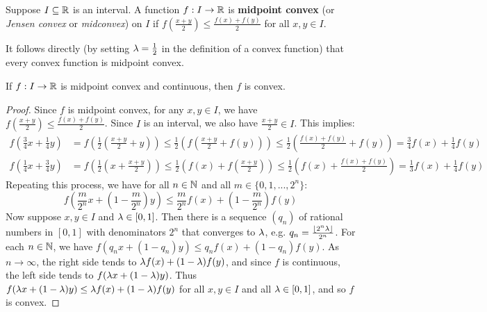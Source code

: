 \documentclass{article}
\begin{document}
\begin{definition}
    Suppose $I\sub\R$ is an interval. A function $f:I\to\R$ is \textbf{midpoint convex} (or \textit{Jensen convex} or \textit{midconvex}) on $I$ if $f\left(\frac{x+y}{2}\right)\le\frac{f(x)+f(y)}{2}$ for all $x,y\in I$.
\end{definition}
\begin{remark}
    It follows directly (by setting $\lambda=\frac{1}{2}$ in the definition of a convex function) that every convex function is midpoint convex.
\end{remark}



\begin{theorem}
    If $f:I\to\R$ is midpoint convex and continuous, then $f$ is convex.
\end{theorem}
\begin{proof}
    Since $f$ is midpoint convex, for any $x,y\in I$, we have $f\left(\frac{x+y}{2}\right)\le\frac{f(x)+f(y)}{2}$. Since $I$ is an interval, we also have $\frac{x+y}{2}\in I$. This implies:
    \begin{align*}
        f\left(\frac{3}{4}x+\frac{1}{4}y\right)
        &=f\left(\frac{1}{2}\left(\frac{x+y}{2}+y\right)\right)
        \le\frac{1}{2}\left(f\left(\frac{x+y}{2}+f(y)\right)\right)
        \le\frac{1}{2}\left(\frac{f(x)+f(y)}{2}+f(y)\right)
        =\frac{3}{4}f(x)+\frac{1}{4}f(y)
        \\
        f\left(\frac{1}{4}x+\frac{3}{4}y\right)
        &=f\left(\frac{1}{2}\left(x+\frac{x+y}{2}\right)\right)
        \le\frac{1}{2}\left(f(x)+f\left(\frac{x+y}{2}\right)\right)
        \le\frac{1}{2}\left(f(x)+\frac{f(x)+f(y)}{2}\right)
        =\frac{1}{3}f(x)+\frac{1}{4}f(y)
    \end{align*}
    Repeating this process, we have for all $n\in\N$ and all $m\in\{0,1,...,2^n\}$:
    \begin{equation*}
        f\left(\frac{m}{2^n}x+\left(1-\frac{m}{2^n}\right)y\right)
        \le\frac{m}{2^n}f(x)+\left(1-\frac{m}{2^n}\right)f(y)
    \end{equation*}
    Now suppose $x,y\in I$ and $\lambda\in[0,1]$. Then there is a sequence $(q_n)$ of rational numbers in $[0,1]$ with denominators $2^n$ that converges to $\lambda$, e.g. $q_n=\frac{\lfloor 2^n\lambda\rfloor}{2^n}$. For each $n\in\N$, we have $f(q_nx+(1-q_n)y)\le q_nf(x)+(1-q_n)f(y)$. As $n\to\infty$, the right side tends to $\lambda f(x)+(1-\lambda)f(y)$, and since $f$ is continuous, the left side tends to $f(\lambda x+(1-\lambda)y)$. Thus $f(\lambda x+(1-\lambda)y)\le\lambda f(x)+(1-\lambda)f(y)$ for all $x,y\in I$ and all $\lambda\in[0,1]$, and so $f$ is convex.
\end{proof}
\end{document}
